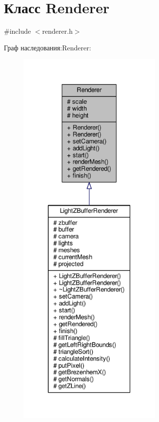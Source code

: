 \hypertarget{class_renderer}{}\section{Класс Renderer}
\label{class_renderer}


{\ttfamily \#include $<$renderer.\+h$>$}



Граф наследования\+:Renderer\+:
\nopagebreak
\begin{figure}[H]
\begin{center}
\leavevmode
\includegraphics[height=550pt]{d6/d70/class_renderer__inherit__graph}
\end{center}
\end{figure}


